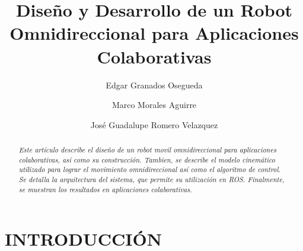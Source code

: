 \documentclass[twocolumn,10pt]{amrob}
\title{Diseño y Desarrollo de un Robot Omnidireccional para Aplicaciones Colaborativas}
\author{Edgar Granados Osegueda
    \affiliation{
	Department of Digital Systems\\
	ITAM\\
	Rio Hondo 1, Ciudad de México, 01080\\
    edgar.granados@itam.mx
    }	
}
\author{Marco Morales Aguirre
       {\tensfb }      
    \affiliation{Department of Digital Systems\\
  ITAM\\
  Rio Hondo 1, Ciudad de México, 01080\\
	marco.morales@itam.mx
    }
}
\author{José Guadalupe Romero Velazquez
       {\tensfb }      
    \affiliation{Department of Digital Systems\\
  ITAM\\
  Rio Hondo 1, Ciudad de México, 01080\\
  jose.romerovelazquez@itam.mx
    }
}
\begin{document}
\graphicspath{ {./Figures/} }
\maketitle    

\begin{abstract}
{\it Este artículo describe el diseño de un robot movil omnidireccional para aplicaciones colaborativas, así como su construcción. Tambien, se describe el modelo cinemático utilizado para lograr el movimiento omnidireccional así como el algoritmo de control. Se detalla la arquitectura del sistema, que permite su utilización en ROS. Finalmente, se muestran los resultados en aplicaciones colaborativas. \par
}
\end{abstract}

\section*{INTRODUCCIÓN}
\end{document}
